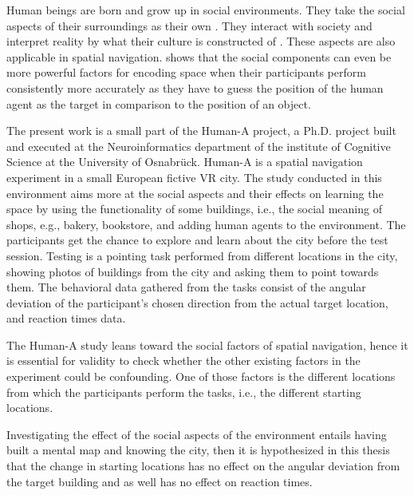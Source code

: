 Human beings are born and grow up in social environments. They take the social aspects of their surroundings as their own \autocite{berger1967luckman}. They interact with society and interpret reality by what their culture is constructed of \autocite{SIEGEL19759}. These aspects are also applicable in spatial navigation. \textcite{kuehn2018social} shows that the social components can even be more powerful factors for encoding space when their participants perform consistently more accurately as they have to guess the position of the human agent as the target in comparison to the position of an object.

The present work is a small part of the Human-A project, a Ph.D. project built and executed at the Neuroinformatics department of the institute of Cognitive Science at the University of Osnabrück. Human-A is a spatial navigation experiment in a small European fictive VR city. The study conducted in this environment aims more at the social aspects and their effects on learning the space by using the functionality of some buildings, i.e., the social meaning of shops, e.g., bakery, bookstore, and adding human agents to the environment. The participants get the chance to explore and learn about the city before the test session. Testing is a pointing task performed from different locations in the city, showing photos of buildings from the city and asking them to point towards them. The behavioral data gathered from the tasks consist of the angular deviation of the participant's chosen direction from the actual target location, and reaction times data.

The Human-A study leans toward the social factors of spatial navigation, hence it is essential for validity to check whether the other existing factors in the experiment could be confounding. One of those factors is the different locations from which the participants perform the tasks, i.e., the different starting locations. 

Investigating the effect of the social aspects of the environment entails having built a mental map and knowing the city, then it is hypothesized in this thesis that the change in starting locations has no effect on the angular deviation from the target building and as well has no effect on reaction times.
